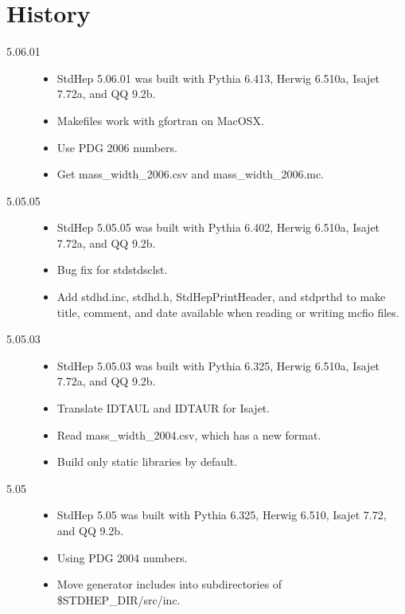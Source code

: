
\section {History}

\begin{description}

\item[5.06.01]

\begin{itemize}
\item StdHep 5.06.01 was built with Pythia 6.413, Herwig 6.510a, 
      Isajet 7.72a, and QQ 9.2b.
\item Makefiles work with gfortran on MacOSX.
\item Use PDG 2006 numbers.
\item Get mass\_width\_2006.csv and mass\_width\_2006.mc.
\end{itemize}


\item[5.05.05]

\begin{itemize}
\item StdHep 5.05.05 was built with Pythia 6.402, Herwig 6.510a, 
      Isajet 7.72a, and QQ 9.2b.
\item Bug fix for stdstdsclst.
\item Add stdhd.inc, stdhd.h, StdHepPrintHeader, and stdprthd 
      to make title, comment, and date available when 
      reading or writing mcfio files.
\end{itemize}

\item[5.05.03]

\begin{itemize}
\item StdHep 5.05.03 was built with Pythia 6.325, Herwig 6.510a, 
      Isajet 7.72a, and QQ 9.2b.
\item Translate IDTAUL and IDTAUR for Isajet.
\item Read mass\_width\_2004.csv, which has a new format.
\item Build only static libraries by default.
\end{itemize}


\item[5.05]

\begin{itemize}
\item StdHep 5.05 was built with Pythia 6.325, Herwig 6.510, 
      Isajet 7.72, and QQ 9.2b.
\item Using PDG 2004 numbers.
\item Move generator includes into subdirectories of \$STDHEP\_DIR/src/inc.
\end{itemize}


\end{description}
